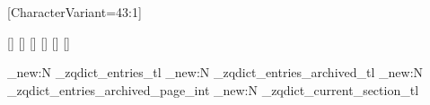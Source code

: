 \usepackage{hyperref}

\usepackage[disablejfam]{luatexja}
\usepackage{luatexja-fontspec}
\usepackage{luatexja-ruby}

\usepackage{expl3}
\usepackage{adjustbox}
\usepackage{calc}
\usepackage{fancyhdr}
\usepackage{ifthen}
\usepackage{multicol}
\usepackage{pdfcomment}
\usepackage{pxpic}
\usepackage{enumitem}
\usepackage{titlesec}
\usepackage{xparse}

\usepackage{geometry}

\setmainfont{Junicode}
\setsansfont{Noto Sans}
\setfontface{}[CharacterVariant={43:1}]





\newjfontfamily{}[]
\newjfontfamily{}[]
\newjfontfamily{}[]
\newjfontfamily{}[]
\newjfontfamily{}[]
\newjfontfamily{}[]

\newcommand{\textJapn}[1]{{%
    \fontMainJapn%
    #1%
  }}
\newcommand{\textKor}[1]{{%
    \fontMainKo
    #1%
  }}
\newcommand{\textHant}[1]{{%
    \fontMainHans%
    #1%
  }}
\newcommand{\textHans}[1]{{%
    \fontMainHans%
    #1%
  }}


\newlength{\EntryDescriptionLineLength}
\newlength{\EntryDescriptionLineHeight}
\newlength{\EntryDescriptionLineIndent}

\providecommand\phantomsection{}

\geometry{top=10mm,headheight=18pt,headsep=2pt,inner=20mm,outer=10mm,textheight=55em}

\ExplSyntaxOn

\tl_new:N \g_zqdict_entries_tl
\tl_new:N \g_zqdict_entries_archived_tl
\int_new:N \g_zqdict_entries_archived_page_int
\tl_new:N \g_zqdict_current_section_tl

